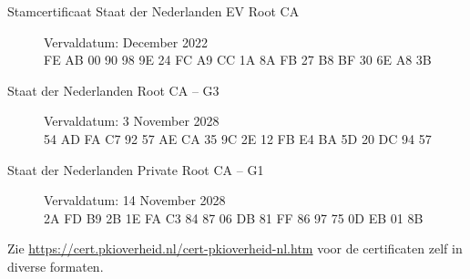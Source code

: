 \documentclass[11.0pt,twoside,openright]{report}
\begin{document}
\begin{description}
\item[Stamcertificaat Staat der Nederlanden EV Root CA]  Vervaldatum: December 2022 \\

FE AB 00 90 98 9E 24 FC A9 CC 1A 8A FB 27 B8 BF 30 6E A8 3B \\

\item[Staat der Nederlanden Root CA -- G3] Vervaldatum: 3 November 2028 \\

54 AD FA C7 92 57 AE CA 35 9C 2E 12 FB E4 BA 5D 20 DC 94 57 \\

\item[Staat der Nederlanden Private Root CA -- G1] Vervaldatum: 14 November 2028  \\

2A FD B9 2B 1E FA C3 84 87 06 DB 81 FF 86 97 75 0D EB 01 8B \\
\end{description}

Zie \url{https://cert.pkioverheid.nl/cert-pkioverheid-nl.htm} voor de certificaten zelf in diverse formaten.
\end{document}
